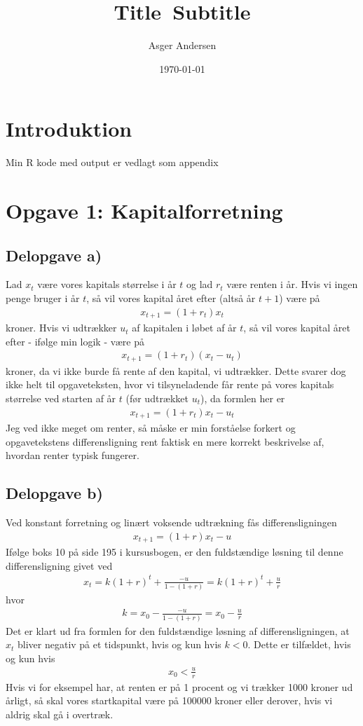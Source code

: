\documentclass[12pt]{article}
\title{
  Title\
  \large Subtitle
}
\author{Asger Andersen}
\date{\today}
\begin{document}
\section*{Introduktion}

Min R kode med output er vedlagt som appendix

\section{Opgave 1: Kapitalforretning}

\subsection{Delopgave a)}

Lad $x_t$ være vores kapitals størrelse i år $t$ og lad $r_t$ være renten i år. Hvis vi ingen penge bruger i år $t$, så vil vores kapital året efter (altså år $t+1$) være på 
\begin{align}
x_{t+1} = (1+r_t)x_t
\end{align}
kroner. Hvis vi udtrækker $u_t$ af kapitalen i løbet af år $t$, så vil vores kapital året efter - ifølge min logik - være på
\begin{align}
x_{t+1} = (1+r_t)(x_t - u_t)
\end{align}
kroner, da vi ikke burde få rente af den kapital, vi udtrækker. Dette svarer dog ikke helt til opgaveteksten, hvor vi tilsyneladende får rente på vores kapitals størrelse ved starten af år $t$ (før udtrækket $u_t$), da formlen her er
\begin{align}
x_{t+1} = (1+r_t)x_t - u_t
\end{align}
Jeg ved ikke meget om renter, så måske er min forståelse forkert og opgavetekstens differensligning rent faktisk en mere korrekt beskrivelse af, hvordan renter typisk fungerer.

\subsection{Delopgave b)} 

Ved konstant forretning og linært voksende udtrækning fås differensligningen
\begin{align}
x_{t+1} = (1+r)x_t - u
\end{align}
Ifølge boks 10 på side 195 i kursusbogen, er den fuldstændige løsning til denne differensligning givet ved
\begin{align}
x_t = k(1+r)^t + \frac{-u}{1 - (1+r)} = k(1+r)^t + \frac{u}{r}
\end{align}
hvor 
\begin{align}
k = x_0 - \frac{-u}{1 - (1+r)} = x_0 - \frac{u}{r}
\end{align}
Det er klart ud fra formlen for den fuldstændige løsning af differensligningen, at $x_t$ bliver negativ på et tidspunkt, hvis og kun hvis $k<0$. Dette er tilfældet, hvis og kun hvis
\begin{align}
x_0 < \frac{u}{r}
\end{align} 
Hvis vi for eksempel har, at renten er på 1 procent og vi trækker 1000 kroner ud årligt, så skal vores startkapital være på 100000 kroner eller derover, hvis vi aldrig skal gå i overtræk.
\end{document}
